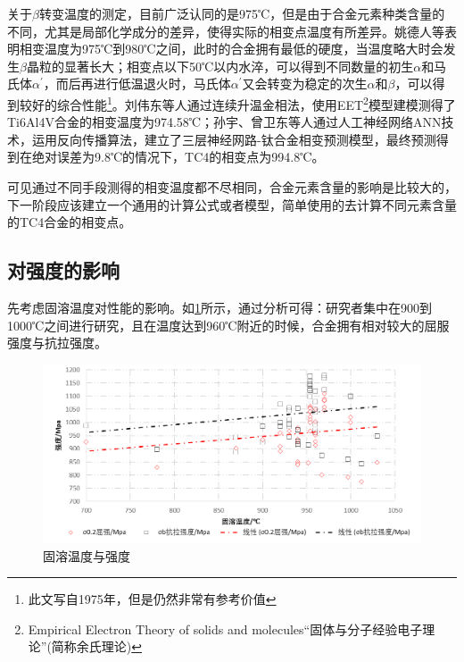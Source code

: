 \documentclass[
class = book,
zihao = -4,
font = noto,
paper = a4paper,
openany
]{easybook}
\newcommand{\ti}{Ti6Al4V}
\begin{document}
关于$\beta$转变温度的测定，目前广泛认同的是975℃，但是由于合金元素种类含量的不同，尤其是局部化学成分的差异，使得实际的相变点温度有所差异\cite{wangtaoTC4hejinxiangbianwendujiancezhongjieguobuyizhiyuanyinfenxi2013}。姚德人等\cite{yaoderenTc4taihejinxiangbiandiandeceding1975}表明相变温度为975℃到980℃之间，此时的合金拥有最低的硬度，当温度略大时会发生$\beta$晶粒的显著长大；相变点以下50℃以内水淬，可以得到不同数量的初生$ \alpha $和马氏体$ \alpha^{'} $，而后再进行低温退火时，马氏体$ \alpha^{'} $又会转变为稳定的次生$ \alpha$和$ \beta $，可以得到较好的综合性能\footnote{\color{red}此文写自1975年，但是仍然非常有参考价值}。刘伟东等人\cite{liuweidongTC4hejinVzhuanbianwendudejinxiangfacedingyulilunjisuan2014}通过连续升温金相法，使用EET\footnote{Empirical Electron Theory of solids and molecules“固体与分子经验电子理论”(简称余氏理论)}模型建模测得了\ti 合金的相变温度为974.58℃；孙宇、曾卫东等人\cite{sunyuYingyongrengongshenjingwangluoyanjiuhuaxueyuansuduitaihejinxiangbiandiandeyingxiang2010}通过人工神经网络ANN技术，运用反向传播算法，建立了三层神经网路-钛合金相变预测模型，最终预测得到在绝对误差为9.8℃的情况下，TC4的相变点为994.8℃。

可见通过不同手段测得的相变温度都不尽相同，合金元素含量的影响是比较大的，下一阶段应该建立一个通用的计算公式或者模型，简单使用的去计算不同元素含量的TC4合金的相变点。

\subsection{对强度的影响}
先考虑固溶温度对性能的影响。如\ref{fig:固溶温度与强度}所示，通过分析可得：研究者集中在900到1000℃之间进行研究，且在温度达到960℃附近的时候，合金拥有相对较大的屈服强度与抗拉强度。

\begin{figure}[h!]
	\centering
	\includegraphics[width=0.7\linewidth]{固溶温度与强度}
	\caption{固溶温度与强度}
	\label{fig:固溶温度与强度}
\end{figure}
\end{document}
